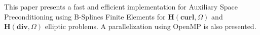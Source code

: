 This paper presents a fast and efficient implementation for Auxiliary Space Preconditioning using B-Splines Finite Elements for $\bm{H}(\textbf{curl},\Omega)$ and $\bm{H}(\textbf{div},\Omega)$ elliptic problems. A parallelization using OpenMP is also presented.
